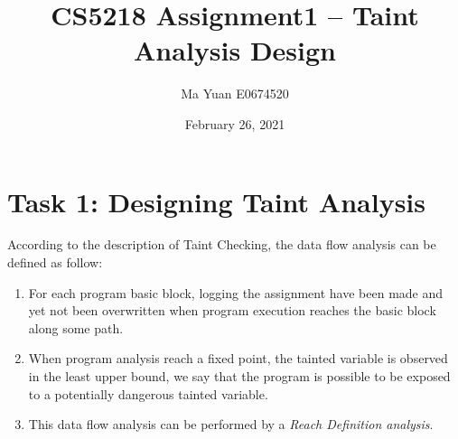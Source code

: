 \documentclass[english,12pt]{article}
\title{CS5218 Assignment1 -- Taint Analysis Design}
\date{February 26, 2021}
\author{Ma Yuan E0674520}
\begin{document}
	\maketitle
	
	\section{Task 1: Designing Taint Analysis} \label{sec:task1}
	
	According to the description of Taint Checking, the data flow analysis can be defined as follow:
	\begin{enumerate}
		\item For each program basic block, logging the assignment have been made and yet not been overwritten when program execution reaches the basic block along some path.
		\item When program analysis reach a fixed point, the tainted variable is observed in the least upper bound, we say that the program is possible to be exposed to a potentially dangerous tainted variable. 
		\item This data flow analysis can be performed by a {\em Reach Definition analysis}. 
	\end{enumerate}
	
\end{document}
